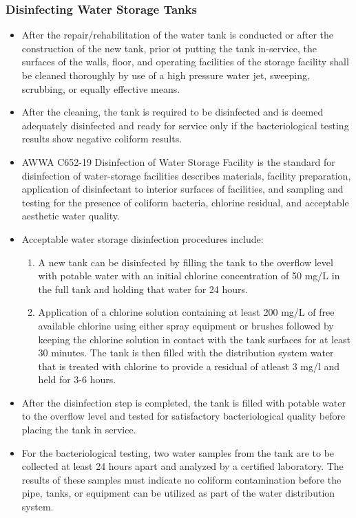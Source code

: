 \subsubsection{Disinfecting Water Storage Tanks} 
\begin{itemize}
\item After the repair/rehabilitation of the water tank is conducted or after the construction of the new tank, prior ot putting the tank in-service, the surfaces of the walls, floor, and operating facilities of the storage facility shall be cleaned thoroughly by use of a high pressure water jet, sweeping, scrubbing, or equally effective means. 

\item After the cleaning, the tank is required to be disinfected and is deemed adequately disinfected and ready for service only if the bacteriological testing results show negative coliform results.

\item AWWA C652-19  Disinfection of Water Storage Facility is the standard for disinfection of water-storage facilities describes materials, facility preparation, application of disinfectant to interior surfaces of facilities, and sampling and testing for the presence of coliform bacteria, chlorine residual, and acceptable aesthetic water quality. 

\item Acceptable water storage disinfection procedures include:
\begin{enumerate}
\item A new tank can be disinfected by filling the tank to the overflow level with potable water with an initial chlorine concentration of 50 mg/L in the full tank and holding that water for 24 hours.

\item Application of a chlorine solution containing at least 200 mg/L of free available chlorine using either spray equipment or brushes followed by keeping the chlorine solution in contact with the tank surfaces for at least 30 minutes.  The tank is then filled with the distribution system water that is treated with chlorine to provide a residual of atleast 3 mg/l and held for 3-6 hours.  
\end{enumerate}
\item After the disinfection step is completed, the tank is filled with potable water to the overflow level and tested for satisfactory bacteriological quality before placing the tank in service.

\item For the bacteriological testing, two water samples from the tank are to be collected at least 24 hours apart and analyzed by a certified laboratory. The results of these samples must indicate no coliform contamination before the pipe, tanks, or equipment can be utilized as part of the water distribution system. 
\end{itemize}

